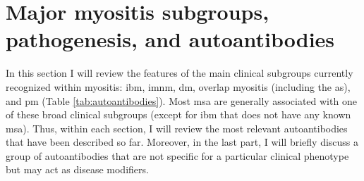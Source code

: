 \section{Major myositis subgroups, pathogenesis, and autoantibodies}

In this section I will review the features of the main clinical subgroups currently recognized within myositis: \gls{ibm}, \gls{imnm}, \gls{dm}, overlap myositis (including the \gls{as}), and \gls{pm} (Table \ref{tab:autoantibodies}). Most \gls{msa} are generally associated with one of these broad clinical subgroups (except for \gls{ibm} that does not have any known \gls{msa}). Thus, within each section, I will review the most relevant autoantibodies that have been described so far. Moreover, in the last part, I will briefly discuss a group of autoantibodies that are not specific for a particular clinical phenotype but may act as disease modifiers.

